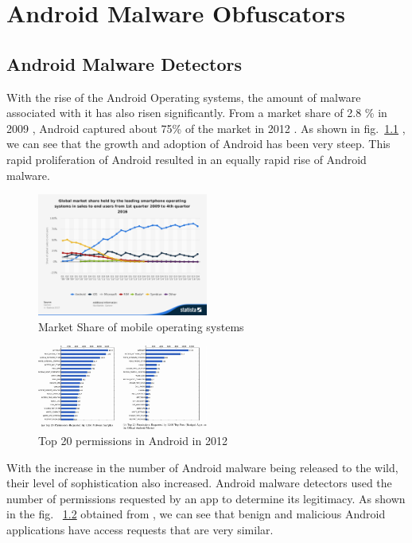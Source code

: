 \chapter{Android Malware Obfuscators}

\section{Android Malware Detectors}
With the rise of the Android Operating systems, the amount of malware associated with it has also risen significantly. From a market share of 2.8 \% in 2009 \cite{androidShare2009} , Android captured about 75\% of the market in 2012 \cite{androidShare2009}. As shown in fig.~\ref{osMarketShare} , we can see that the growth and adoption of Android has been very steep. This rapid proliferation of Android resulted in an equally rapid rise of Android malware.

\begin{figure}[osMarketShare]
	\centering
	\includegraphics[width=0.5\textwidth]{OS_Market_Share.png}
	\caption{Market Share of mobile operating systems}
	\label{osMarketShare}
\end{figure}

\begin{figure}[permissionsAndroid]
	\centering
	\includegraphics[width=0.5\textwidth]{permissionsList1.png}
	\caption{Top 20 permissions in Android in 2012}
	\label{permissionsAndroid}
\end{figure}
With the increase in the number of Android malware being released to the wild, their level of sophistication also increased. Android malware detectors used the number of permissions requested by an app to determine its legitimacy. As shown in the fig. ~\ref{permissionsAndroid} obtained from \cite{zhou}, we can see that benign and malicious Android applications have access requests that are very similar.

